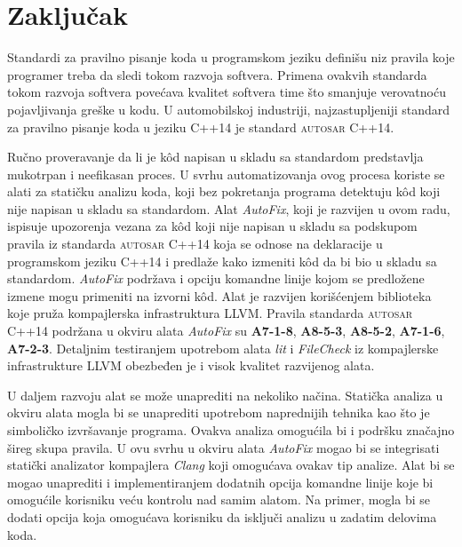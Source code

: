 \documentclass[12pt,oneside]{memoir}
\begin{document}



\chapter{Zaključak}

Standardi za pravilno pisanje koda u programskom jeziku defini\v{s}u niz pravila koje programer treba da sledi tokom razvoja softvera. Primena ovakvih standarda
tokom razvoja softvera pove\'{c}ava kvalitet softvera time \v{s}to smanjuje verovatno\'{c}u pojavljivanja gre\v{s}ke u kodu. U automobilskoj industriji,
najzastupljeniji standard za pravilno pisanje koda u jeziku C++14 je standard \textsc{autosar} C++14.
\par
Ru\v{c}no proveravanje da li je k\^{o}d napisan u skladu sa standardom predstavlja mukotrpan i neefikasan proces. U svrhu automatizovanja ovog procesa
koriste se alati za stati\v{c}ku analizu koda, koji bez pokretanja programa detektuju k\^{o}d koji nije napisan u skladu sa standardom. Alat \textit{AutoFix}, koji je razvijen u ovom radu, ispisuje upozorenja vezana za k\^{o}d koji nije napisan u skladu sa podskupom pravila iz standarda \textsc{autosar} C++14 koja se odnose na deklaracije u programskom jeziku C++14 i predla\v{z}e kako izmeniti k\^{o}d da bi bio u skladu sa standardom. \textit{AutoFix} podr\v{z}ava i opciju komandne linije kojom se predlo\v{z}ene izmene mogu primeniti na izvorni k\^{o}d. Alat je razvijen kori\v{s}\'{c}enjem biblioteka koje pru\v{z}a kompajlerska infrastruktura LLVM. Pravila standarda \textsc{autosar} C++14 podr\v{z}ana u okviru alata \textit{AutoFix} su \textbf{A7-1-8}, \textbf{A8-5-3}, \textbf{A8-5-2}, \textbf{A7-1-6}, \textbf{A7-2-3}. Detaljnim testiranjem upotrebom alata \textit{lit} i \textit{FileCheck} iz kompajlerske infrastrukture LLVM obezbeđen je i visok kvalitet razvijenog alata.

\par
U daljem razvoju alat se mo\v{z}e unaprediti na nekoliko na\v{c}ina. 
Stati\v{c}ka analiza u okviru alata mogla bi se unaprediti upotrebom naprednijih tehnika kao \v{s}to je simboli\v{c}ko izvr\v{s}avanje programa. Ovakva analiza
omogu\'{c}ila bi i podr\v{s}ku zna\v{c}ajno \v{s}ireg skupa pravila. U ovu svrhu u okviru alata \textit{AutoFix} mogao bi se integrisati stati\v{c}ki analizator kompajlera \textit{Clang} koji omogu\'{c}ava ovakav tip analize. Alat bi se mogao unaprediti i implementiranjem dodatnih opcija komandne linije koje bi omogu\'{c}ile korisniku ve\'{c}u
kontrolu nad samim alatom. Na primer, mogla bi se dodati opcija koja omogu\'{c}ava korisniku da isklju\v{c}i analizu u zadatim delovima koda.
\end{document}
